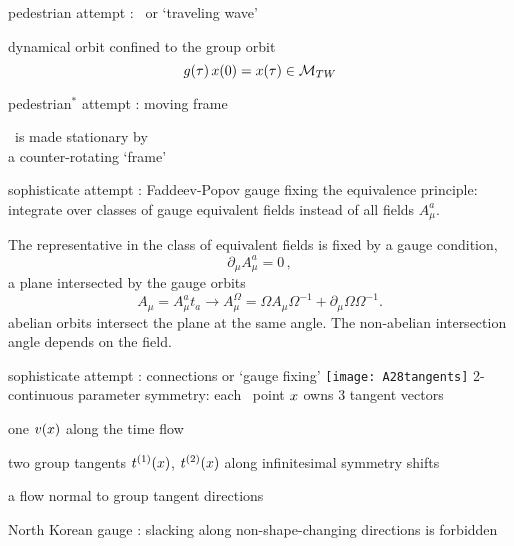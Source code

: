 \begin{frame}{pedestrian attempt : \reqv\ or `traveling wave'}

dynamical orbit confined to the group orbit
\[
g(\tau) \, x(0) =
x(\tau) \in {\cal M}_{TW_{}}
\]
\end{frame}

\begin{frame}{pedestrian${}^*$ attempt : moving frame}

\reqv\ is made stationary by
\\
a counter-rotating `frame'

\end{frame}

\begin{frame}{sophisticate attempt : Faddeev-Popov gauge fixing}
the equivalence principle: integrate over classes of gauge equivalent fields instead
of all fields $A_\mu^a$.

The representative in the class of equivalent fields is
fixed by a gauge condition,
\[
    \partial_{\mu} A_{\mu}^{a} = 0
    \,,
\]
a plane intersected by the gauge orbits
\[
    A_{\mu} = A_{\mu}^{a}t_{a} \to A_{\mu}^{\Omega}
            = \Omega A_{\mu} \Omega^{-1} + \partial_{\mu} \Omega \Omega^{-1} .
\]
abelian orbits intersect the plane at the same angle.
The non-abelian
intersection angle depends on the field.
\end{frame}

\begin{frame}{sophisticate attempt : connections or `gauge fixing'}
\texttt{[image: A28tangents]}
2-continuous parameter symmetry: each \statesp\ point
$x$ owns 3 tangent vectors

one $v(x)$ along the time flow

two group tangents $t^{(1)}(x)$, $t^{(2)}(x)$
along infinitesimal symmetry shifts

\begin{block}{a flow }
normal to group tangent directions
\end{block}

North Korean gauge : slacking along non-shape-changing directions is
forbidden
\end{frame}


